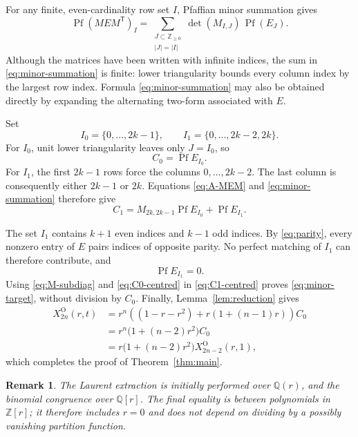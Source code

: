 \documentclass[11pt]{article}
\newtheorem{remark}[theorem]{Remark}
\newcommand{\Pf}{\operatorname{Pf}}
\newcommand{\Z}{\mathbb{Z}}
\newcommand{\Q}{\mathbb{Q}}
\begin{document}
For any finite, even-cardinality row set \(I\), Pfaffian
minor summation gives
\begin{equation}
 \Pf(MEM^{\mathsf T})_I
 =\sum_{\substack{J\subset\Z_{\geq0}\\ |J|=|I|}}
 \det(M_{I,J})\,\Pf(E_J).
 \label{eq:minor-summation}
\end{equation}
Although the matrices have been written with infinite indices, the sum in
\eqref{eq:minor-summation} is finite: lower triangularity bounds every
column index by the largest row index.  Formula
\eqref{eq:minor-summation} may also be obtained directly by expanding the
alternating two-form associated with \(E\).

Set
\[
 I_0=\{0,\ldots,2k-1\},\qquad
 I_1=\{0,\ldots,2k-2,2k\}.
\]
For \(I_0\), unit lower triangularity leaves only \(J=I_0\), so
\begin{equation}
 C_0=\Pf E_{I_0}.
 \label{eq:C0-centred}
\end{equation}
For \(I_1\), the first \(2k-1\) rows force the columns
\(0,\ldots,2k-2\).  The last column is consequently either \(2k-1\)
or \(2k\).  Equations \eqref{eq:A-MEM} and
\eqref{eq:minor-summation} therefore give
\begin{equation}
 C_1=M_{2k,2k-1}\Pf E_{I_0}+\Pf E_{I_1}.
 \label{eq:C1-centred}
\end{equation}

The set \(I_1\) contains \(k+1\) even indices and \(k-1\) odd indices.
By \eqref{eq:parity}, every nonzero entry of \(E\) pairs indices of
opposite parity.  No perfect matching of \(I_1\) can therefore contribute,
and
\[
 \Pf E_{I_1}=0.
\]
Using \eqref{eq:M-subdiag} and \eqref{eq:C0-centred} in
\eqref{eq:C1-centred} proves \eqref{eq:minor-target}, without division by
\(C_0\).  Finally, Lemma~\ref{lem:reduction} gives
\begin{align*}
 [t^3]X^{\mathrm O}_{2n}(r,t)
 &=r^n\left((1-r-r^2)+r(1+(n-1)r)\right)C_0\\
 &=r^n\bigl(1+(n-2)r^2\bigr)C_0\\
 &=r\bigl(1+(n-2)r^2\bigr)X^{\mathrm O}_{2n-2}(r,1),
\end{align*}
which completes the proof of Theorem~\ref{thm:main}.

\begin{remark}
The Laurent extraction is initially performed over \(\Q(r)\), and the
binomial congruence over \(\Q[r]\).  The final equality is between
polynomials in \(\Z[r]\); it therefore includes \(r=0\) and does not depend
on dividing by a possibly vanishing partition function.
\end{remark}
\end{document}
